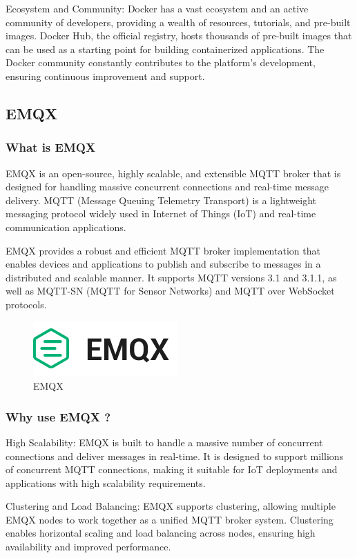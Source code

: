 \documentclass[
12pt,
oneside, 
onehalfspacing, 
nolistspacing, 
parskip, 
chapterinoneline, 
]{AASTCOMPUTER}
\begin{document}
Ecosystem and Community: Docker has a vast ecosystem and an active community of developers, providing a wealth of resources, tutorials, and pre-built images. Docker Hub, the official registry, hosts thousands of pre-built images that can be used as a starting point for building containerized applications. The Docker community constantly contributes to the platform's development, ensuring continuous improvement and support.
\newpage
\subsection{EMQX}
\subsubsection{What is EMQX}
EMQX is an open-source, highly scalable, and extensible MQTT broker that is designed for handling massive concurrent connections and real-time message delivery. MQTT (Message Queuing Telemetry Transport) is a lightweight messaging protocol widely used in Internet of Things (IoT) and real-time communication applications.

EMQX provides a robust and efficient MQTT broker implementation that enables devices and applications to publish and subscribe to messages in a distributed and scalable manner. It supports MQTT versions 3.1 and 3.1.1, as well as MQTT-SN (MQTT for Sensor Networks) and MQTT over WebSocket protocols.

\begin{figure}[!ht]
	\centering
	\includegraphics[scale=0.5]{Figures/Backend/EMQX.png}
  	\caption{EMQX}
  	\label{fig:EMQX}
\end{figure}

\subsubsection{Why use EMQX ?}
High Scalability: EMQX is built to handle a massive number of concurrent connections and deliver messages in real-time. It is designed to support millions of concurrent MQTT connections, making it suitable for IoT deployments and applications with high scalability requirements.

Clustering and Load Balancing: EMQX supports clustering, allowing multiple EMQX nodes to work together as a unified MQTT broker system. Clustering enables horizontal scaling and load balancing across nodes, ensuring high availability and improved performance.
\end{document}
